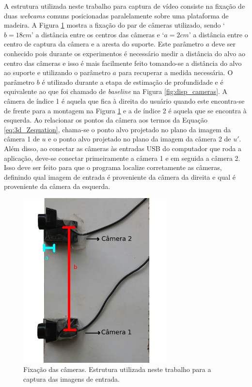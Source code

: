 A estrutura utilizada neste trabalho para captura de vídeo consiste na fixação de duas \textit{webcams} comuns posicionadas paralelamente sobre uma plataforma de madeira. A Figura \ref{fig:setupCameras} mostra a fixação do par de câmeras utilizado, sendo `$b = 18cm$'  a distância entre os centros das câmeras e `$a = 2 cm$' a distância entre o centro de captura da câmera e a aresta do suporte. Este parâmetro $a$ deve ser conhecido pois durante os experimentos é necessário medir a distância do alvo ao centro das câmeras e isso é mais facilmente feito tomando-se a distância do alvo ao suporte e utilizando o parâmetro $a$ para recuperar a medida necessária. O parâmetro $b$ é utilizado durante a etapa de estimação de profundidade e é equivalente ao que foi chamado de \textit{baseline} na Figura \ref{fig:disp_cameras}. A câmera de índice 1 é aquela que fica à direita do usuário quando este encontra-se de frente para a montagem na Figura \ref{fig:setupCameras} e a de índice 2 é aquela que se encontra à esquerda. Ao relacionar os pontos da câmera aos termos da Equação \ref{eq:3d_Zequation}, chama-se o ponto alvo projetado no plano da imagem da câmera 1 de $u$ e o ponto alvo projetado no plano da imagem da câmera 2 de $u'$. Além disso, ao conectar as câmeras às entradas USB do computador que roda a aplicação, deve-se conectar primeiramente a câmera 1 e em seguida a câmera 2. Isso deve ser feito para que o programa localize corretamente as câmeras, definindo qual imagem de entrada é proveniente da câmera da direita e qual é proveniente da câmera da esquerda. 


\begin{figure}[!htb]
\centering
\includegraphics[width=0.7\textwidth]{figs/setupExperimento-marcado_edit-2.png}
\caption{Fixação das câmeras. Estrutura utilizada neste trabalho para a captura das imagens de entrada.}
\label{fig:setupCameras}
\end{figure}



